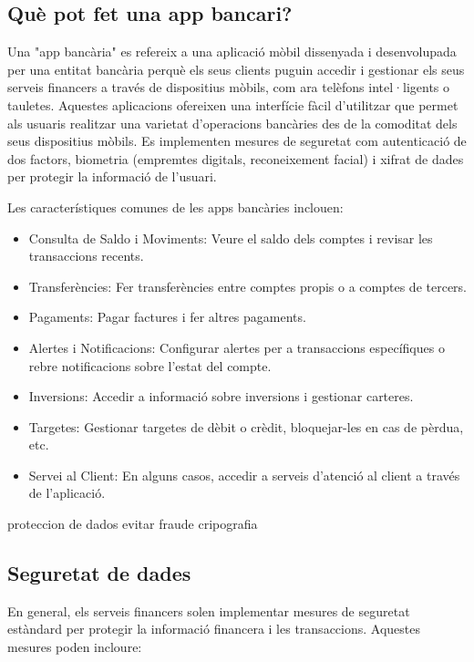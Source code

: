 \subsection*{Què pot fet una app bancari?}

Una "app bancària" es refereix a una aplicació mòbil dissenyada i desenvolupada per una entitat bancària perquè els seus clients puguin accedir i gestionar els seus serveis financers a través de dispositius mòbils, com ara telèfons intel·ligents o tauletes. Aquestes aplicacions ofereixen una interfície fàcil d'utilitzar que permet als usuaris realitzar una varietat d'operacions bancàries des de la comoditat dels seus dispositius mòbils. Es implementen mesures de seguretat com autenticació de dos factors, biometria (empremtes digitals, reconeixement facial) i xifrat de dades per protegir la informació de l'usuari.

Les característiques comunes de les apps bancàries inclouen:

\begin{itemize}
    \item Consulta de Saldo i Moviments: Veure el saldo dels comptes i revisar les transaccions recents.
    \item Transferències: Fer transferències entre comptes propis o a comptes de tercers.
    \item  Pagaments: Pagar factures i fer altres pagaments.
    \item Alertes i Notificacions: Configurar alertes per a transaccions específiques o rebre notificacions sobre l'estat del compte.
    \item Inversions: Accedir a informació sobre inversions i gestionar carteres.
    \item Targetes: Gestionar targetes de dèbit o crèdit, bloquejar-les en cas de pèrdua, etc.
    \item Servei al Client: En alguns casos, accedir a serveis d'atenció al client a través de l'aplicació.
\end{itemize}




proteccion de dados
evitar fraude
cripografia


\subsection*{Seguretat de dades}


En general, els serveis financers solen implementar mesures de seguretat estàndard per protegir la informació financera i les transaccions. Aquestes mesures poden incloure:

